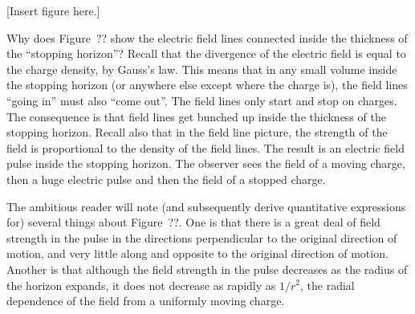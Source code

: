 [Insert figure here.]

Why does Figure~?? show the electric field lines connected inside the
thickness of the ``stopping horizon''?  Recall that the divergence of
the electric field is equal to the charge density, by Gauss's law.
This means that in any small volume inside the stopping horizon (or
anywhere else except where the charge is), the field lines ``going
in'' must also ``come out''.  The field lines only start and stop on
charges.  The consequence is that field lines get bunched up inside
the thickness of the stopping horizon.  Recall also that in the field
line picture, the strength of the field is proportional to the density
of the field lines.  The result is an electric field pulse inside the
stopping horizon.  The observer sees the field of a moving charge,
then a huge electric pulse and then the field of a stopped charge.

The ambitious reader will note (and subsequently derive quantitative
expressions for) several things about Figure~??.  One is that there is
a great deal of field strength in the pulse in the directions
perpendicular to the original direction of motion, and very little
along and opposite to the original direction of motion.  Another is
that although the field strength in the pulse decreases as the radius
of the horizon expands, it does not decrease as rapidly as $1/r^2$,
the radial dependence of the field from a uniformly moving charge.
